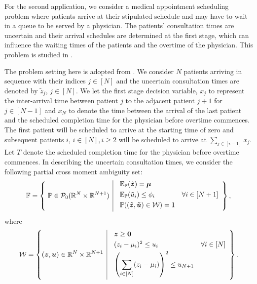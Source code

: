 \documentclass[fleqn,isre,blindrev]{informs4}
\newcommand{\mb}[1]{\mbox{\boldmath \ensuremath{#1}}}
\newcommand{\mbt}[1]{\mb{\tilde{#1}}}
\renewcommand{\Re}{\mathbb{R}}
\begin{document}
		For the second application, we consider a medical appointment scheduling problem where patients arrive at their stipulated schedule and may have to wait in a queue to be served by a physician.  The patients' consultation times are uncertain and their arrival schedules are determined at the first stage, which can influence the waiting times of the patients and the overtime of the physician. This problem is studied in \cite{kltz13, mrz14, bsz17}.
		
		The problem setting here is adopted from \cite{bsz17}. We consider $N$ patients arriving in sequence with their indices $j \in [N]$ and the uncertain consultation times are denoted by $\tilde{z}_j$, $j \in [N]$.
		We let the first stage decision variable, $x_j$ to represent the  inter-arrival time between patient $j$ to the adjacent patient $j+1$ for $j\in [N-1]$ and $x_{N}$ to denote the time between the arrival of the last patient   and the scheduled completion time for the physician before overtime commences. The first patient will be scheduled to arrive at the starting time of zero and  subsequent patients  $i$, $i \in [N], i\geq 2$ will be scheduled to arrive at  $\sum_{j \in[i-1]}x_j$. Let $T$ denote the scheduled completion time for the physician before overtime commences. In describing the uncertain consultation times, we consider the following partial cross moment ambiguity set:
\begin{equation*}
		\mathbb{F} = \left\{ \ \mathbb{P}\in\mathcal{P}_0(\Re^{N}\times \Re^{N+1}) \enskip \vline \enskip
		\begin{array}{ll}
		\mathbb{E}_{\mathbb{P}}(\mbt{z}) = \mb{\mu} \vspace{3pt}\\
		\mathbb{E}_{\mathbb{P}}(\tilde{u}_i) \leq  \phi_i & \forall i \in [N+1] \vspace{3pt}\\
		\mathbb{P}( (\mbt{z}, \mbt{u})\in \mathcal{W}) = 1 \vspace{3pt}
		\end{array}
		\right\},
\end{equation*}
		where
\begin{equation*}
			\label{eq:W3set}
			\mathcal{W} = \left\{ (\mb{z}, \mb{u})\in \Re^{N}\times\Re^{N+1} \enskip \vline \enskip
			\begin{array}{ll}
				\mb{z} \geq \mb{0}  \vspace{3pt}\\
				(z_i-\mu_i)^2 \leq u_i& \forall i \in [N]  \vspace{3pt}\\
				\displaystyle  \left(\sum_{i\in [N]}(z_i - \mu_i)\right)^2 \leq u_{N+1} \vspace{3pt}
			\end{array}
			\right\}.
\end{equation*}
\end{document}
